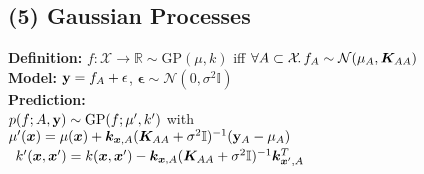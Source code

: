 \subsection*{(5) Gaussian Processes}
\textbf{Definition:} $f: \mathcal{X} \rightarrow \mathbb{R} \sim \mathrm{GP}(\mu, k)$ iff $\forall A \subset \mathcal{X}\!.\, f_A \sim \mathcal{N}(\mu_A, {\bm{K}}_{AA})$\\
\textbf{Model:} 
${\mathbf{y}} = f_A + \mathbf{\epsilon}$, $\mathbf{\epsilon} \sim \mathcal{N}(0, \sigma^2\mathbb{I})$\\
\textbf{Prediction:}\\
$p(f;A,{\mathbf{y}}) \sim \mathrm{GP}(f;\mu', k')$ with\\
\mbox{\hspace{-1em}$\mu'({\bm{x}}) = \mu({\bm{x}}) + {\bm{k}}_{{\bm{x}},A}({\bm{K}}_{AA} + \sigma^2\mathbb{I})^{-1}({\mathbf{y}}_A - \mu_A)$}\\
\mbox{\hspace{-2em}
$k'({\bm{x}},{\bm{x}}') = k({\bm{x}},{\bm{x}}') - {\bm{k}}_{{\bm{x}},A}({\bm{K}}_{AA}+\sigma^2\mathbb{I})^{-1}{\bm{k}}^T_{{\bm{x}}',A}$}\\

